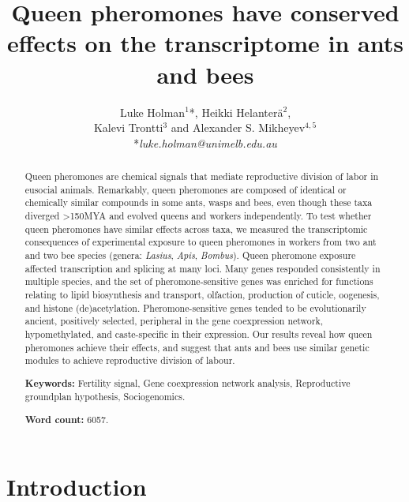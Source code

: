 \documentclass[12pt,]{article}
\title{Queen pheromones have conserved effects on the transcriptome in ants and
bees}
\author{Luke Holman\(^1\)*, Heikki Helanterä\(^{2}\), \\ Kalevi Trontti\(^3\) and Alexander S. Mikheyev\(^{4,5}\) \\ *\textit{luke.holman@unimelb.edu.au} \vspace{5mm}}
\date{}
\begin{document}
\maketitle
\begin{abstract}
\noindent Queen pheromones are chemical signals that mediate
reproductive division of labor in eusocial animals. Remarkably, queen
pheromones are composed of identical or chemically similar compounds in
some ants, wasps and bees, even though these taxa diverged
\textgreater{}150MYA and evolved queens and workers independently. To
test whether queen pheromones have similar effects across taxa, we
measured the transcriptomic consequences of experimental exposure to
queen pheromones in workers from two ant and two bee species (genera:
\emph{Lasius}, \emph{Apis}, \emph{Bombus}). Queen pheromone exposure
affected transcription and splicing at many loci. Many genes responded
consistently in multiple species, and the set of pheromone-sensitive
genes was enriched for functions relating to lipid biosynthesis and
transport, olfaction, production of cuticle, oogenesis, and histone
(de)acetylation. Pheromone-sensitive genes tended to be evolutionarily
ancient, positively selected, peripheral in the gene coexpression
network, hypomethylated, and caste-specific in their expression. Our
results reveal how queen pheromones achieve their effects, and suggest
that ants and bees use similar genetic modules to achieve reproductive
division of labour. \vspace{5mm} \par\noindent \textbf{Keywords:}
Fertility signal, Gene coexpression network analysis, Reproductive
groundplan hypothesis, Sociogenomics. \vspace{5mm}
\par\noindent \textbf{Word count:} 6057.
\end{abstract}

\maketitle{}
\newpage

\section{Introduction}\label{introduction}
\end{document}
